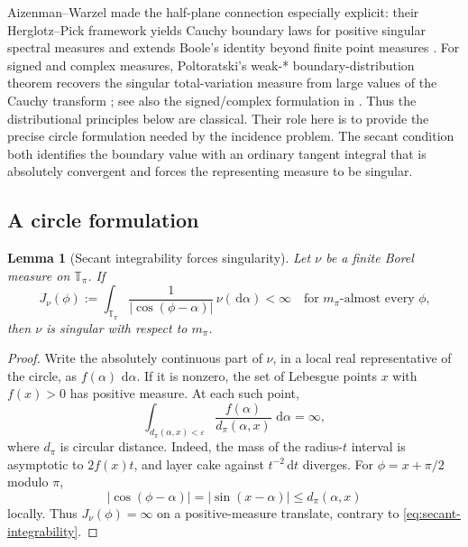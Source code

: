 \documentclass[11pt]{article}
\numberwithin{equation}{section}
\theoremstyle{thmstyleone}%
\newtheorem{lemma}[lemma]{Lemma}
\theoremstyle{thmstyletwo}%
\let\cref\autoref
\newcommand{\dd}{\,\mathrm d}
\begin{document}
Aizenman--Warzel made the half-plane connection especially explicit: their
Herglotz--Pick framework yields Cauchy boundary laws for positive singular
spectral measures and extends Boole's identity beyond finite point measures
\cite{aizenman-warzel-2015}.  For signed and complex measures,
Poltoratski's weak-* boundary-distribution theorem recovers the singular
total-variation measure from large values of the Cauchy transform
\cite{poltoratski-1996}; see also the signed/complex formulation in
\cite[Theorem~8.3]{cima-matheson-ross-2006}.  Thus the distributional
principles below are classical.  Their role here is to provide the precise
circle formulation needed by the incidence problem.  The secant condition
both identifies the boundary value with an ordinary tangent integral that is
absolutely convergent and forces the representing measure to be singular.

\subsection{A circle formulation}

\begin{lemma}[Secant integrability forces singularity]
\label{lem:secant-singularity}
Let \(\nu\) be a finite Borel measure on \(\mathbb T_\pi\).  If
\begin{equation}
  J_\nu(\phi)
  :=
  \int_{\mathbb T_\pi}
  \frac{1}{|\cos(\phi-\alpha)|}\,\nu(\dd\alpha)
  <\infty
  \quad\text{for \(m_\pi\)-almost every \(\phi\),}
  \label{eq:secant-integrability}
\end{equation}
then \(\nu\) is singular with respect to \(m_\pi\).
\end{lemma}

\begin{proof}
Write the absolutely continuous part of \(\nu\), in a local real
representative of the circle, as \(f(\alpha)\,\dd\alpha\).  If it is
nonzero, the set of Lebesgue points \(x\) with \(f(x)>0\) has positive
measure.  At each such point,
\[
  \int_{d_\pi(\alpha,x)<\varepsilon}
  \frac{f(\alpha)}{d_\pi(\alpha,x)}\,\dd\alpha
  =\infty,
\]
where \(d_\pi\) is circular distance.  Indeed, the mass of the
radius-\(t\) interval is asymptotic to \(2f(x)t\), and layer cake against
\(t^{-2}\dd t\) diverges.  For
\(\phi=x+\pi/2\) modulo \(\pi\),
\[
  |\cos(\phi-\alpha)|
  =|\sin(x-\alpha)|
  \leq d_\pi(\alpha,x)
\]
locally.  Thus \(J_\nu(\phi)=\infty\) on a positive-measure translate,
contrary to \cref{eq:secant-integrability}.
\end{proof}
\end{document}
